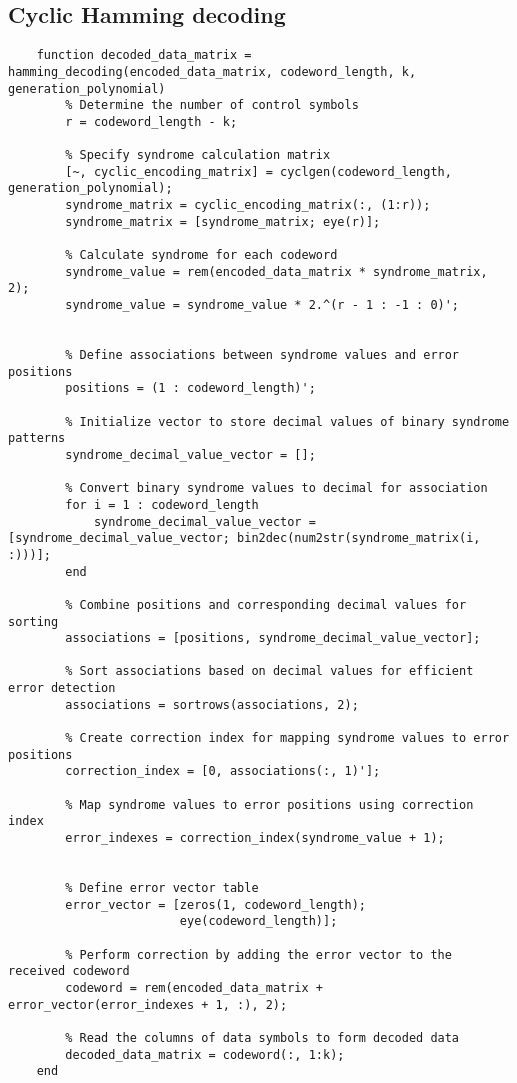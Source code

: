 \subsection{Cyclic Hamming decoding}


\begin{lstlisting}
    function decoded_data_matrix = hamming_decoding(encoded_data_matrix, codeword_length, k, generation_polynomial)
        % Determine the number of control symbols
        r = codeword_length - k;
        
        % Specify syndrome calculation matrix
        [~, cyclic_encoding_matrix] = cyclgen(codeword_length, generation_polynomial);
        syndrome_matrix = cyclic_encoding_matrix(:, (1:r));
        syndrome_matrix = [syndrome_matrix; eye(r)];
        
        % Calculate syndrome for each codeword
        syndrome_value = rem(encoded_data_matrix * syndrome_matrix, 2);
        syndrome_value = syndrome_value * 2.^(r - 1 : -1 : 0)';
        
    
        % Define associations between syndrome values and error positions
        positions = (1 : codeword_length)'; 
    
        % Initialize vector to store decimal values of binary syndrome patterns
        syndrome_decimal_value_vector = [];
    
        % Convert binary syndrome values to decimal for association
        for i = 1 : codeword_length
            syndrome_decimal_value_vector = [syndrome_decimal_value_vector; bin2dec(num2str(syndrome_matrix(i, :)))];
        end
    
        % Combine positions and corresponding decimal values for sorting
        associations = [positions, syndrome_decimal_value_vector];
    
        % Sort associations based on decimal values for efficient error detection
        associations = sortrows(associations, 2);
    
        % Create correction index for mapping syndrome values to error positions
        correction_index = [0, associations(:, 1)'];
    
        % Map syndrome values to error positions using correction index
        error_indexes = correction_index(syndrome_value + 1);
        
    
        % Define error vector table
        error_vector = [zeros(1, codeword_length);
                        eye(codeword_length)];
        
        % Perform correction by adding the error vector to the received codeword
        codeword = rem(encoded_data_matrix + error_vector(error_indexes + 1, :), 2);
        
        % Read the columns of data symbols to form decoded data
        decoded_data_matrix = codeword(:, 1:k);
    end
\end{lstlisting}
